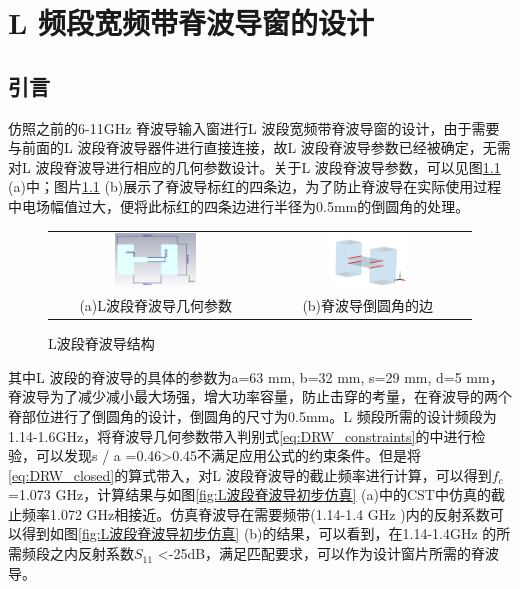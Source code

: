 \documentclass[master]{thesis-uestc}
\begin{document}
\chapter{L 频段宽频带脊波导窗的设计}
\section{引言}
仿照之前的6-11GHz 脊波导输入窗进行L 波段宽频带脊波导窗的设计，由于需要与前面的L 波段脊波导器件进行直接连接，故L 波段脊波导参数已经被确定，无需对L 波段脊波导进行相应的几何参数设计。关于L 波段脊波导参数，可以见图\ref{fig:L波段脊波导结构} (a)中；图片\ref{fig:L波段脊波导结构} (b)展示了脊波导标红的四条边，为了防止脊波导在实际使用过程中电场幅值过大，便将此标红的四条边进行半径为0.5mm的倒圆角的处理。

\begin{figure}[!htb]
    \small
    \centering
    \begin{tabular}{@{\ }c@{\ }c}
        \includegraphics[width=0.4\textwidth]{pic/chapter4/L波段脊波导几何参数.png} & 
        \hspace{5pt}
        \includegraphics[width=0.4\textwidth]{pic/chapter4/脊波导倒圆角边.png}     \\
        \mbox{\small (a)L波段脊波导几何参数}                                                                               & 
        \mbox{\small (b)脊波导倒圆角的边}                                                                                  \\
    \end{tabular}
    \caption{L波段脊波导结构}
    \label{fig:L波段脊波导结构}
\end{figure}

其中L 波段的脊波导的具体的参数为a=63 mm, b=32 mm, s=29 mm, d=5 mm，脊波导为了减少减小最大场强，增大功率容量，防止击穿的考量，在脊波导的两个脊部位进行了倒圆角的设计，倒圆角的尺寸为0.5mm。L 频段所需的设计频段为1.14-1.6GHz，将脊波导几何参数带入判别式\ref{eq:DRW_constraints}的中进行检验，可以发现s / a =0.46>0.45不满足应用公式的约束条件。但是将\ref{eq:DRW_closed}的算式带入，对L 波段脊波导的截止频率进行计算，可以得到$f_c$=1.073 GHz，计算结果与如图\ref{fig:L波段脊波导初步仿真} (a)中的CST中仿真的截止频率1.072 GHz相接近。仿真脊波导在需要频带(1.14-1.4 GHz )内的反射系数可以得到如图\ref{fig:L波段脊波导初步仿真} (b)的结果，可以看到，在1.14-1.4GHz 的所需频段之内反射系数$S_{11}$ <-25dB，满足匹配要求，可以作为设计窗片所需的脊波导。
\end{document}
